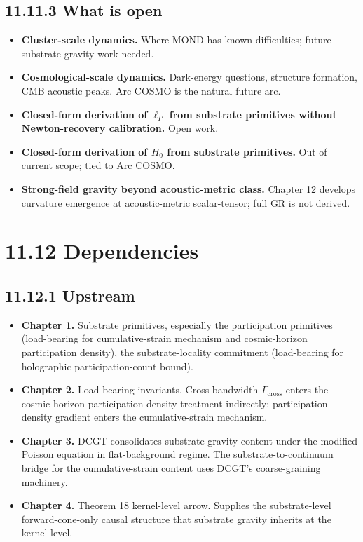 \documentclass[11pt]{book}
\begin{document}
\subsection{11.11.3 What is open}

\begin{itemize}
\item \textbf{Cluster-scale dynamics.} Where MOND has known difficulties; future substrate-gravity work needed.
\item \textbf{Cosmological-scale dynamics.} Dark-energy questions, structure formation, CMB acoustic peaks. Arc COSMO is the natural future arc.
\item \textbf{Closed-form derivation of $\ell_P$ from substrate primitives without Newton-recovery calibration.} Open work.
\item \textbf{Closed-form derivation of $H_0$ from substrate primitives.} Out of current scope; tied to Arc COSMO.
\item \textbf{Strong-field gravity beyond acoustic-metric class.} Chapter 12 develops curvature emergence at acoustic-metric scalar-tensor; full GR is not derived.
\end{itemize}

\section{11.12 Dependencies}

\subsection{11.12.1 Upstream}

\begin{itemize}
\item \textbf{Chapter 1.} Substrate primitives, especially the participation primitives (load-bearing for cumulative-strain mechanism and cosmic-horizon participation density), the substrate-locality commitment (load-bearing for holographic participation-count bound).
\item \textbf{Chapter 2.} Load-bearing invariants. Cross-bandwidth $\Gamma_\mathrm{cross}$ enters the cosmic-horizon participation density treatment indirectly; participation density gradient enters the cumulative-strain mechanism.
\item \textbf{Chapter 3.} DCGT consolidates substrate-gravity content under the modified Poisson equation in flat-background regime. The substrate-to-continuum bridge for the cumulative-strain content uses DCGT's coarse-graining machinery.
\item \textbf{Chapter 4.} Theorem 18 kernel-level arrow. Supplies the substrate-level forward-cone-only causal structure that substrate gravity inherits at the kernel level.
\end{itemize}
\end{document}
